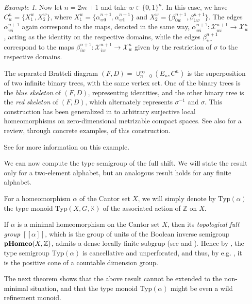 \documentclass[11pt]{amsart}
\theoremstyle{plain}            %
\theoremstyle{definition}       %
\theoremstyle{definition}       %
\theoremstyle{remark}
\newtheorem{example}[theorem]{Example}
\newcommand{\Typ}{\mathrm{Typ}}
\newcommand{\pHomeo}{\mathrm{\bf pHomeo}}
\def\Z{\mathbb{Z}}
\begin{document}
\begin{example}
 Now let $n= 2m+1$ and take $w\in \{ 0,1 \}^n$. In this case, we have  $C^n_w= \{ X^w_1 , X^w_2 \}$,
 where $X^w_1= \{ \alpha^{n+1}_{w0}, \alpha^{n+1}_{w1} \}$ and $X^w_2 = \{ \beta^{n+1}_{0w} , \beta^{n+1}_{1w} \}$.
The edges $\alpha^{n+1}_{wi}$ again correspond to the maps, denoted in the
same way,  $\alpha^{n+1}_{wi} \colon \mathcal X^{n+1}_{wi} \to
\mathcal X^n_w$, acting as the identity on the respective domains, while the edges $\beta^{n+1}_{iw}$ correspond to the maps  $\beta^{n+1}_{iw} \colon \mathcal X^{n+1}_{iw} \to \mathcal X^n_w$ given by the restriction of $\sigma$ to the respective domains.

The separated Bratteli diagram $(F,D)= \cup _{n=0}^{\infty} (E_n,C^n)$ is the superposition of two infinite binary trees, with the same vertex set. One of the binary trees is the {\it blue skeleton}
of $(F,D)$, representing identities, and the other binary tree is the {\it red skeleton} of $(F,D)$, which alternately represents $\sigma^{-1}$ and $\sigma$. 
This construction has been generalized in \cite{ac24} to arbitrary surjective local homeomorphisms on zero-dimensional metrizable compact spaces. See also \cite{claramunt} for a review, through concrete examples, of this construction. 
 \end{example}

See \cite{al18} for more information on this example.

\medskip

We can now compute the type semigroup of the full shift. We will state the result only for a two-element alphabet, but an analogous result holds for any finite alphabet. 


For a homeomorphism $\alpha$ of the Cantor set $X$, we will simply denote by $\Typ (\alpha)$ the type monoid $\Typ (X, G ,\mathbb K)$ of the associated action of $\Z$ on $X$. 

If $\alpha $ is a minimal homeomorphism on the Cantor set $X$, then its {\it topological full group} $ [[ \alpha ]]$, which is the group of units of the Boolean inverse semigroup $\pHomeo (X, \Z)$, admits a dense locally finite subgrup (see \cite{GPS95} and \cite{Mell-Robert}). Hence by \cite[Theorem 2.26]{Melleray}, the type semigroup $\Typ (\alpha)$ is cancellative and unperforated, and thus, by e.g. \cite[Theorem 3.14]{ag15}, it is the positive cone of a countable dimension group.

The next theorem shows that the above result cannot be extended to the non-minimal situation, and that the type monoid $\Typ (\alpha)$ might be even a wild refinement monoid. 
\end{document}
